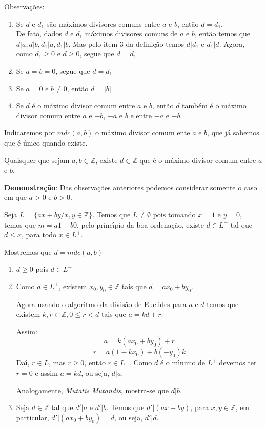 Observa{\c c}{\~o}es:
\begin{enumerate}
\item Se $d$ e $d_{1}$ s{\~a}o m{\'a}ximos divisores comuns entre $a$ e $b$, ent{\~a}o $d=d_{1}$.\\

De fato, dados $d$ e $d_{1}$ m{\'a}ximos divisores comuns de $a$ e $b$, ent{\~a}o temos que $d|a,d|b,d_{1}|a,d_{1}|b$. Mas pelo item 3 da defini{\c c}{\~a}o temos $d|d_{1}$ e $d_{1}|d$. Agora, como $d_{1}\geq 0$ e $d\geq 0$, segue que $d=d_{1}$
\item Se $a=b=0$, segue que $d=d_{1}$ %
\item Se $a=0$ e $b\neq 0$, ent{\~a}o $d=|b|$
\item Se $d$ {\'e} o m{\'a}ximo divisor comum entre $a$ e $b$, ent{\~a}o $d$ tamb{\'e}m {\'e} o m{\'a}ximo divisor comum entre $a$ e $-b$, $-a$ e $b$ e entre $-a$ e $-b$.
\end{enumerate}

\begin{nota} Indicaremos por $mdc(a,b)$ o m{\'a}ximo divisor comum ente $a$ e $b$, que j{\'a} sabemos que {\'e} {\'u}nico quando existe.\end{nota}

\begin{proposicao} Quaisquer que sejam $a,b\in\mathbb{Z}$, existe $d\in\mathbb{Z}$ que {\'e} o m{\'a}ximo divisor comum entre $a$ e $b$.\end{proposicao}

\textbf{Demonstra{\c c}{\~a}o}: Das observa{\c c}{\~o}es anteriores podemos considerar somente o caso em que $a>0$ e $b>0$.

Seja $L=\{ax+by/x,y\in\mathbb{Z}\}$. Temos que $L\neq\emptyset$ pois tomando $x=1$ e $y=0$, temos que $m=a1+b0$, pelo princ{\'\i}pio da boa ordena{\c c}{\~a}o, existe $d\in L^{+}$ tal que $d\leq x$, para todo $x\in L^{+}$.

Mostremos que $d=mdc(a,b)$
\begin{enumerate}
\item $d\geq 0$ pois $d\in L^{+}$
\item Como $d\in L^{+}$, existem $x_{0},y_{0}\in\mathbb{Z}$ tais que $d=ax_{0}+by_{0}$.

Agora usando o algoritmo da divis{\~a}o de Euclides para $a$ e $d$ temos que existem $k,r\in\mathbb{Z},0\leq r<d$ tais que $a=kd+r$.

Assim:\[a=k(ax_{0}+by_{0})+r\] \[r=a(1-kx_{0})+b(-y_{0})k\] Da{\'\i}, $r\in L$, mas $r\geq 0$, ent{\~a}o $r\in L^{+}$. Como $d$ {\'e} o m{\'\i}nimo de $L^{+}$ devemos ter $r=0$ e assim $a=kd$, ou seja, $d|a$.

Analogamente, \textit{Mutatis Mutandis}, mostra-se que $d|b$.
\item Seja $d\in\mathbb{Z}$ tal que $d'|a$ e $d'|b$. Temos que $d'|(ax+by)$, para $x,y\in\mathbb{Z}$, em particular, $d'|(ax_{0}+by_{0})=d$, ou seja, $d'|d$.
\end{enumerate}

